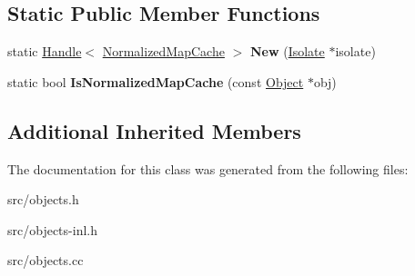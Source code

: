 \subsection*{Static Public Member Functions}
\begin{DoxyCompactItemize}
\item 
\hypertarget{classv8_1_1internal_1_1_normalized_map_cache_a0dcfd10a848e942ed4032e7855365bbe}{}static \hyperlink{classv8_1_1internal_1_1_handle}{Handle}$<$ \hyperlink{classv8_1_1internal_1_1_normalized_map_cache}{Normalized\+Map\+Cache} $>$ {\bfseries New} (\hyperlink{classv8_1_1internal_1_1_isolate}{Isolate} $\ast$isolate)\label{classv8_1_1internal_1_1_normalized_map_cache_a0dcfd10a848e942ed4032e7855365bbe}

\item 
\hypertarget{classv8_1_1internal_1_1_normalized_map_cache_af5ef6a0f3e920953ac4f76695514801c}{}static bool {\bfseries Is\+Normalized\+Map\+Cache} (const \hyperlink{classv8_1_1internal_1_1_object}{Object} $\ast$obj)\label{classv8_1_1internal_1_1_normalized_map_cache_af5ef6a0f3e920953ac4f76695514801c}

\end{DoxyCompactItemize}
\subsection*{Additional Inherited Members}


The documentation for this class was generated from the following files\+:\begin{DoxyCompactItemize}
\item 
src/objects.\+h\item 
src/objects-\/inl.\+h\item 
src/objects.\+cc\end{DoxyCompactItemize}
